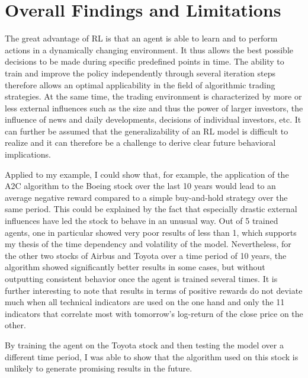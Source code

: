 \section{Overall Findings and Limitations}

The great advantage of RL is that an agent is able to learn and to perform actions in a
dynamically changing environment. It thus allows the best possible decisions to be made
during specific predefined points in time. The ability to train and improve the policy
independently through several iteration steps therefore allows an optimal applicability in
the field of algorithmic trading strategies. At the same time, the trading environment is
characterized by more or less external influences such as the size and thus the power of
larger investors, the influence of news and daily developments, decisions of individual
investors, etc. It can further be assumed that the generalizability of an RL model is
difficult to realize and it can therefore be a challenge to derive clear future behavioral
implications.

Applied to my example, I could show that, for example, the application of the A2C
algorithm to the Boeing stock over the last 10 years would lead to an average negative
reward compared to a simple buy-and-hold strategy over the same period. This could be
explained by the fact that especially drastic external influences have led the stock to
behave in an unusual way. Out of 5 trained agents, one in particular showed very poor
results of less than 1, which supports my thesis of the time dependency and volatility of
the model. Nevertheless, for the other two stocks of Airbus and Toyota over a time period
of 10 years, the algorithm showed significantly better results in some cases, but without
outputting consistent behavior once the agent is trained several times. It is further
interesting to note that results in terms of positive rewards do not deviate much when all
technical indicators are used on the one hand and only the 11 indicators that correlate
most with tomorrow's log-return of the close price on the other.

By training the agent on the Toyota stock and then testing the model over a different time
period, I was able to show that the algorithm used on this stock is unlikely to generate
promising results in the future.
